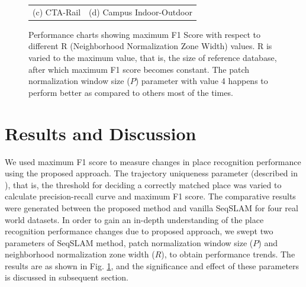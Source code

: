 \documentclass[letterpaper, 10 pt, conference]{ieeeconf}  %
\begin{document}
\begin{figure}
\begin{tabular*}{\textwidth}[t]{cc}
(c) CTA-Rail & (d) Campus Indoor-Outdoor \\
 \end{tabular*}
 \caption{Performance charts showing maximum F1 Score with respect to different R (Neighborhood Normalization Zone Width) values. R is varied to the maximum value, that is, the size of reference database, after which maximum F1 score becomes constant. The patch normalization window size ($P$) parameter with value 4 happens to perform better as compared to others most of the times.}
 \label{fig:performanceChart}
\end{figure}


\section{Results and Discussion}
We used maximum F1 score to measure changes in place recognition performance using the proposed approach. The trajectory uniqueness parameter (described in \cite{Milford2012}), that is, the threshold for deciding a correctly matched place was varied to calculate precision-recall curve and maximum F1 score. The comparative results were generated between the proposed method and vanilla SeqSLAM for four real world datasets. In order to gain an in-depth understanding of the place recognition performance changes due to proposed approach, we swept two parameters of SeqSLAM method, patch normalization window size ($P$) and neighborhood normalization zone width ($R$), to obtain performance trends. The results are as shown in Fig. \ref{fig:performanceChart}, and the significance and effect of these parameters is discussed in subsequent section. 
\end{document}
